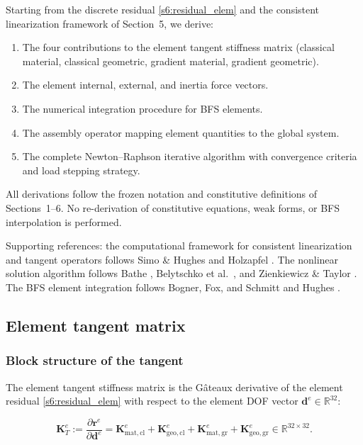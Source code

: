 \documentclass[11pt]{article}
\begin{document}
Starting from the discrete residual
\eqref{s6:residual_elem} and the consistent linearization framework
of Section~5, we derive:
\begin{enumerate}
\item The four contributions to the element tangent stiffness matrix
  (classical material, classical geometric, gradient material, gradient
  geometric).
\item The element internal, external, and inertia force vectors.
\item The numerical integration procedure for BFS elements.
\item The assembly operator mapping element quantities to the global
  system.
\item The complete Newton--Raphson iterative algorithm with convergence
  criteria and load stepping strategy.
\end{enumerate}

All derivations follow the frozen notation and constitutive
definitions of Sections~1--6. No re-derivation of constitutive
equations, weak forms, or BFS interpolation is performed.

Supporting references: the computational framework for consistent
linearization and tangent operators follows
Simo \& Hughes \cite{SimoHughes1998} and Holzapfel
\cite{Holzapfel2000}. The nonlinear solution algorithm follows
Bathe \cite{Bathe2006}, Belytschko et al.\
\cite{Belytschko2000}, and Zienkiewicz \& Taylor
\cite{ZienkiewiczTaylor2000}. The BFS element integration follows
Bogner, Fox, and Schmitt \cite{BognerFoxSchmitt1965} and
Hughes \cite{Hughes1987}.

\subsection{Element tangent matrix}
\label{ssec:tangent}

\subsubsection{Block structure of the tangent}

The element tangent stiffness matrix is the G\^ateaux derivative of the
element residual \eqref{s6:residual_elem} with respect to the element
DOF vector $\mathbf{d}^e \in \mathbb{R}^{32}$:

\begin{equation}
\boxed{
\mathbf{K}_{T}^{e}
:= \frac{\partial \mathbf{r}^{e}}{\partial \mathbf{d}^{e}}
= \mathbf{K}_{\mathrm{mat,cl}}^{e}
+ \mathbf{K}_{\mathrm{geo,cl}}^{e}
+ \mathbf{K}_{\mathrm{mat,gr}}^{e}
+ \mathbf{K}_{\mathrm{geo,gr}}^{e}
\in \mathbb{R}^{32 \times 32}.
}
\label{s7:tangent_total}
\end{equation}
\end{document}
